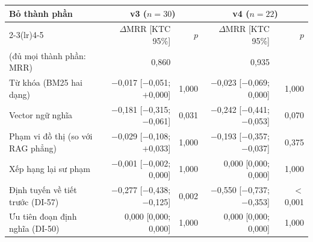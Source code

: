 \footnotesize
\begin{tabular}{@{}lrrrr@{}}
\toprule
Bỏ thành phần & \multicolumn{2}{c}{v3 ($n=30$)} & \multicolumn{2}{c}{v4 ($n=22$)} \\
\cmidrule(lr){2-3}\cmidrule(lr){4-5}
 & $\Delta$MRR [KTC 95\%] & $p$ & $\Delta$MRR [KTC 95\%] & $p$ \\
\midrule
(đủ mọi thành phần: MRR) & 0,860 & & 0,935 & \\
Từ khóa (BM25 hai dạng) & $-$0,017 [$-$0,051; $+$0,000] & 1,000 & $-$0,023 [$-$0,069; 0,000] & 1,000 \\
Vector ngữ nghĩa & $-$0,181 [$-$0,315; $-$0,061] & 0,031 & $-$0,242 [$-$0,441; $-$0,053] & 0,070 \\
Phạm vi đồ thị (so với RAG phẳng) & $-$0,029 [$-$0,108; $+$0,033] & 1,000 & $-$0,193 [$-$0,357; $-$0,037] & 0,375 \\
Xếp hạng lại sư phạm & $-$0,001 [$-$0,002; 0,000] & 1,000 & 0,000 [0,000; 0,000] & 1,000 \\
Định tuyến về tiết trước (DI-57) & $-$0,277 [$-$0,438; $-$0,125] & 0,002 & $-$0,550 [$-$0,737; $-$0,353] & $<$0,001 \\
Ưu tiên đoạn định nghĩa (DI-50) & 0,000 [0,000; 0,000] & 1,000 & 0,000 [0,000; 0,000] & 1,000 \\
\bottomrule
\end{tabular}
